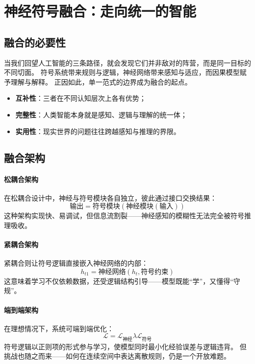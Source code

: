 \section{神经符号融合：走向统一的智能}

\subsection{融合的必要性}

当我们回望人工智能的三条路径，就会发现它们并非敌对的阵营，而是同一目标的不同切面。  
符号系统带来规则与逻辑，神经网络带来感知与适应，而因果模型赋予理解与解释。  
正因如此，单一范式的边界成为融合的起点。  
\begin{itemize}
\item \textbf{互补性}：三者在不同认知层次上各有优势；  
\item \textbf{完整性}：人类智能本身就是感知、逻辑与理解的统一体；  
\item \textbf{实用性}：现实世界的问题往往跨越感知与推理的界限。  
\end{itemize}

\subsection{融合架构}

\paragraph{松耦合架构}
在松耦合设计中，神经与符号模块各自独立，彼此通过接口交换结果：  
$$\text{输出} = \text{符号模块}(\text{神经模块}(\text{输入}))$$
这种架构实现快、易调试，但信息流割裂——神经感知的模糊性无法完全被符号推理吸收。

\paragraph{紧耦合架构}
紧耦合则让符号逻辑直接嵌入神经网络的内部：  
$$h_{t1} = \text{神经网络}(h_t, \text{符号约束})$$
这意味着学习不仅依赖数据，还受逻辑结构引导——模型既能“学”，又懂得“守规”。

\paragraph{端到端架构}
在理想情况下，系统可端到端优化：  
$$\mathcal{L} = \mathcal{L}_{\text{神经}}  \lambda \mathcal{L}_{\text{符号}}$$
符号逻辑以正则项的形式参与学习，使模型同时最小化经验误差与逻辑违背。  
但挑战也随之而来——如何在连续空间中表达离散规则，仍是一个开放难题。

